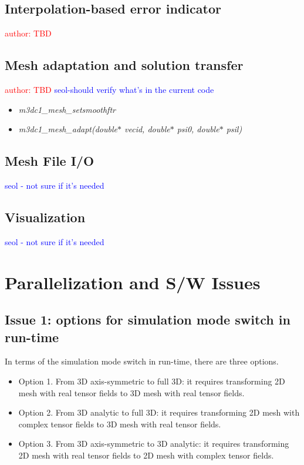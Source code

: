 \documentclass[11pt]{article}  %
\begin{document}
\subsection{Interpolation-based error indicator}\label{sec:step8}
\textcolor{red}{author: TBD}

\subsection{Mesh adaptation and solution transfer}\label{sec:step9}
\textcolor{red}{author: TBD}
\textcolor{blue}{seol-should verify what's in the current code}
\begin{itemize}
\item \emph{m3dc1\_mesh\_setsmoothftr}
\item \emph{m3dc1\_mesh\_adapt(double$\ast$ vecid, double$\ast$ psi0, double$\ast$ psil)}
\end{itemize}

\subsection{Mesh File I/O}\label{sec:step9}
\textcolor{blue}{seol - not sure if it's needed}

\subsection{Visualization}\label{sec:step10}
\textcolor{blue}{seol - not sure if it's needed}


\section{Parallelization and S/W Issues} \label{sec:issues}

\subsection{Issue 1: options for simulation mode switch in run-time}

In terms of the simulation mode switch in run-time, there are three options.
\begin{itemize} 
\item{Option 1.} From 3D axis-symmetric to full 3D: it requires transforming 2D mesh with real tensor fields to 3D mesh with real tensor fields. 
\item{Option 2.} From 3D analytic to full 3D: it requires transforming 2D mesh with complex tensor fields to 3D mesh with real tensor fields.
\item{Option 3.} From 3D axis-symmetric to 3D analytic: it requires transforming 2D mesh with real tensor fields to 2D mesh with complex tensor fields. 
\end{itemize} 
\end{document}
